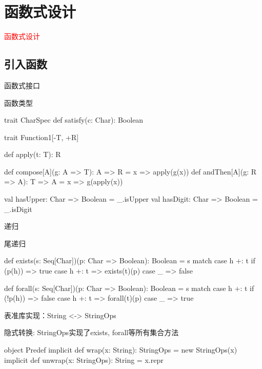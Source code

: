 \section{函数式设计}
\label{sec:fpdesign}

\begin{frame}
  \begin{center}
    \Huge{\textcolor{red}{函数式设计}}
  \end{center}
\end{frame}

\subsection{引入函数}

\begin{frame}[fragile]{函数式接口}
 \begin{block}{函数类型}
  \begin{scala}
trait CharSpec {
  def satisfy(c: Char): Boolean
}

trait Function1[-T, +R] {
  def apply(t: T): R

  def compose[A](g: A => T): A => R = x => apply(g(x))
  def andThen[A](g: R => A): T => A = x => g(apply(x)) 
}

val hasUpper: Char => Boolean = _.isUpper
val hasDigit: Char => Boolean = _.isDigit
  \end{scala}
 \end{block}
\end{frame}

\begin{frame}[fragile]{递归}
 \begin{block}{尾递归}
  \begin{scala}
def exists(s: Seq[Char])(p: Char => Boolean): Boolean =
  s match {
    case h +: t if (p(h)) => true
    case h +: t => exists(t)(p)
    case _ => false
  }

def forall(s: Seq[Char])(p: Char => Boolean): Boolean =
  s match {
    case h +: t if (!p(h)) => false
    case h +: t => forall(t)(p)
    case _ => true
  }
  \end{scala}
 \end{block}
\end{frame}

\begin{frame}[fragile]{表准库实现：String <-> StringOps}
 \begin{block}{隐式转换: StringOps实现了exists, forall等所有集合方法}
  \begin{scala}
object Predef {
  implicit def wrap(x: String): StringOps = new StringOps(x)
  implicit def unwrap(x: StringOps): String = x.repr
}
  \end{scala}
 \end{block}
\end{frame}

